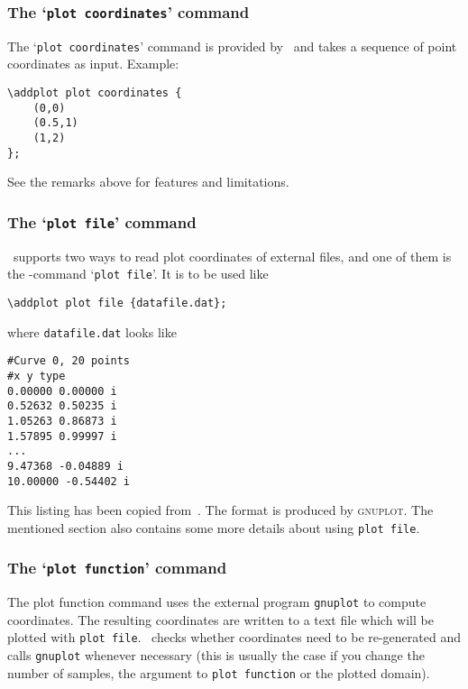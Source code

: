 \subsubsection{The `\texttt{plot coordinates}' command}
The `\texttt{plot coordinates}' command is provided by \Tikz\ and takes a sequence of point coordinates as input. Example:
\begin{lstlisting}
\addplot plot coordinates {
	(0,0)
	(0.5,1)
	(1,2)
};
\end{lstlisting}
See the remarks above for features and limitations.

\subsubsection{The `\texttt{plot file}' command}
\PGFPlots\ supports two ways to read plot coordinates of external files, and one of them is the \Tikz-command `\texttt{plot file}'. It is to be used like
\begin{lstlisting}
\addplot plot file {datafile.dat};
\end{lstlisting}
where \texttt{datafile.dat} looks like
\begin{lstlisting}
#Curve 0, 20 points
#x y type
0.00000 0.00000 i
0.52632 0.50235 i
1.05263 0.86873 i
1.57895 0.99997 i
...
9.47368 -0.04889 i
10.00000 -0.54402 i
\end{lstlisting}
This listing has been copied from~\cite[section~16.4]{tikz}. The format is produced by \textsc{gnuplot}. The mentioned section also contains some more details about using \texttt{plot file}.

\subsubsection{The `\texttt{plot function}' command}
The plot function command uses the external program \texttt{gnuplot} to compute coordinates. The resulting coordinates are written to a text file which will be plotted with \texttt{plot file}. \PGF\ checks whether coordinates need to be re-generated and calls \texttt{gnuplot} whenever necessary (this is usually the case if you change the number of samples, the argument to \texttt{plot function} or the plotted domain).

